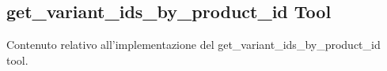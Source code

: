 \subsection{get\_variant\_ids\_by\_product\_id Tool}

Contenuto relativo all'implementazione del get\_variant\_ids\_by\_product\_id tool.
